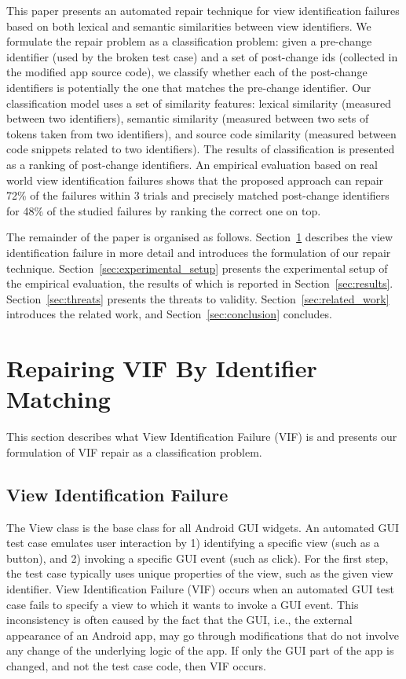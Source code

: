 \documentclass[sigconf]{acmart}
\begin{document}
This paper presents an automated repair technique for view identification
failures based on both lexical and semantic similarities between view
identifiers. We formulate the repair problem as a classification problem:
given a pre-change identifier (used by the broken test case) and a set of
post-change ids (collected in the modified app source code), we classify
whether each of the post-change identifiers is potentially the one that
matches the pre-change identifier. Our classification model uses a set of
similarity features: lexical similarity (measured between two identifiers),
semantic similarity (measured between two sets of tokens taken from two
identifiers), and source code similarity (measured between code snippets
related to two identifiers). The results of classification is presented as a
ranking of post-change identifiers. An empirical evaluation based on real world view identification failures shows that the proposed approach can repair 72\% of the failures within 3 trials and precisely matched post-change identifiers for 48\% of the studied failures by ranking the correct one on top.

The remainder of the paper is organised as follows. Section~\ref{sec:repairing_vif} describes the view identification failure in more detail and introduces the formulation of our repair technique. Section~\ref{sec:experimental_setup} presents the experimental setup of the empirical evaluation, the results of which is reported in Section~\ref{sec:results}. Section~\ref{sec:threats} presents the threats to validity. Section~\ref{sec:related_work} introduces the related work, and Section~\ref{sec:conclusion} concludes.

\section{Repairing VIF By Identifier Matching}
\label{sec:repairing_vif}

This section describes what View Identification Failure (VIF) is and presents
our formulation of VIF repair as a classification problem.

\subsection{View Identification Failure}
\label{sec:vif}

The View class is the base class for all Android GUI widgets. An automated GUI
test case emulates user interaction by 1) identifying a specific view (such as
a button), and 2) invoking a specific GUI event (such as click). For the first
step, the test case typically uses unique properties of the view, such as the
given view identifier. View Identification Failure (VIF) occurs when an
automated GUI test case fails to specify a view to which it wants to invoke a
GUI event. This inconsistency is often caused by the fact that the GUI, i.e.,
the external appearance of an Android app, may go through modifications that
do not involve any change of the underlying logic of the app. If only the GUI
part of the app is changed, and not the test case code, then VIF occurs.
\end{document}
